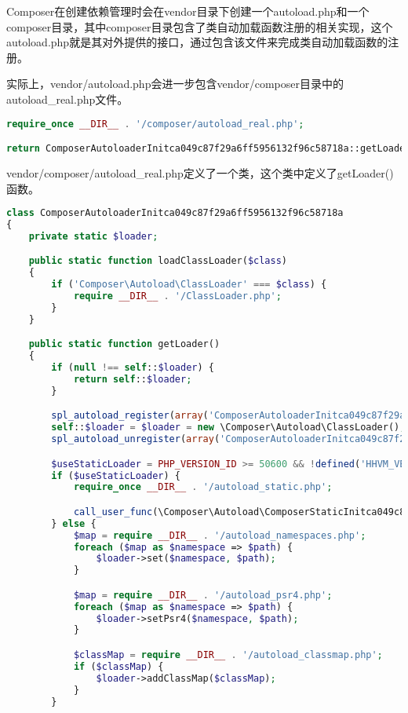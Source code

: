 Composer在创建依赖管理时会在vendor目录下创建一个autoload.php和一个composer目录，其中composer目录包含了类自动加载函数注册的相关实现，这个autoload.php就是其对外提供的接口，通过包含该文件来完成类自动加载函数的注册。

实际上，vendor/autoload.php会进一步包含vendor/composer目录中的autoload\_real.php文件。

\begin{lstlisting}[language=PHP]
require_once __DIR__ . '/composer/autoload_real.php';

return ComposerAutoloaderInitca049c87f29a6ff5956132f96c58718a::getLoader();
\end{lstlisting}


vendor/composer/autoload\_real.php定义了一个类，这个类中定义了getLoader()函数。

\begin{lstlisting}[language=PHP]
class ComposerAutoloaderInitca049c87f29a6ff5956132f96c58718a
{
    private static $loader;

    public static function loadClassLoader($class)
    {
        if ('Composer\Autoload\ClassLoader' === $class) {
            require __DIR__ . '/ClassLoader.php';
        }
    }

    public static function getLoader()
    {
        if (null !== self::$loader) {
            return self::$loader;
        }

        spl_autoload_register(array('ComposerAutoloaderInitca049c87f29a6ff5956132f96c58718a', 'loadClassLoader'), true, true);
        self::$loader = $loader = new \Composer\Autoload\ClassLoader();
        spl_autoload_unregister(array('ComposerAutoloaderInitca049c87f29a6ff5956132f96c58718a', 'loadClassLoader'));

        $useStaticLoader = PHP_VERSION_ID >= 50600 && !defined('HHVM_VERSION');
        if ($useStaticLoader) {
            require_once __DIR__ . '/autoload_static.php';

            call_user_func(\Composer\Autoload\ComposerStaticInitca049c87f29a6ff5956132f96c58718a::getInitializer($loader));
        } else {
            $map = require __DIR__ . '/autoload_namespaces.php';
            foreach ($map as $namespace => $path) {
                $loader->set($namespace, $path);
            }

            $map = require __DIR__ . '/autoload_psr4.php';
            foreach ($map as $namespace => $path) {
                $loader->setPsr4($namespace, $path);
            }

            $classMap = require __DIR__ . '/autoload_classmap.php';
            if ($classMap) {
                $loader->addClassMap($classMap);
            }
        }


\end{lstlisting}
